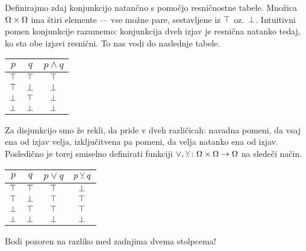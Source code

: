                 Definirajmo zdaj konjunkcijo natančno s pomočjo resničnostne tabele. Množica $\Omega \times \Omega$ ima štiri elemente --- vse možne pare, sestavljene iz $\top$ oz.~$\bot$. Intuitivni pomen konjunkcije razumemo: konjunkcija dveh izjav je resnična natanko tedaj, ko sta obe izjavi resnični. To nas vodi do naslednje tabele.
                \begin{center}
                        \begin{tabular}{cc|c}
                                $p$ & $q$ & $p \land q$ \\
                                \hline
                                $\top$ & $\top$ & $\top$ \\
                                $\top$ & $\bot$ & $\bot$ \\
                                $\bot$ & $\top$ & $\bot$ \\
                                $\bot$ & $\bot$ & $\bot$
                        \end{tabular}
                \end{center}

                Za disjunkcijo smo že rekli, da pride v dveh različicah: navadna pomeni, da vsaj ena od izjav velja, izključitvena pa pomeni, da velja natanko ena od izjav. Posledično je torej smiselno definirati funkciji $\lor, \mathbin{\veebar}\colon \Omega \times \Omega \to \Omega$ na sledeči način.
                \begin{center}
                        \begin{tabular}{cc|cc}
                                $p$ & $q$ & $p \lor q$ & $p \mathbin{\veebar} q$ \\
                                \hline
                                $\top$ & $\top$ & $\top$ & $\bot$ \\
                                $\top$ & $\bot$ & $\top$ & $\top$ \\
                                $\bot$ & $\top$ & $\top$ & $\top$ \\
                                $\bot$ & $\bot$ & $\bot$ & $\bot$
                        \end{tabular}
                \end{center}
                Bodi pozoren na razliko med zadnjima dvema stolpcema!

